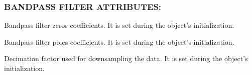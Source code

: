 \documentclass[letterpaper,10pt,english]{sphinxmanual}
\begin{document}
\subsubsection{BANDPASS FILTER ATTRIBUTES:}
\label{pYAAPT:bandpass-filter-attributes}

\begin{fulllineitems}
\label{pYAAPT:BandpassFilter.b}
Bandpass filter zeros coefficients. It is set during the object's initialization.

\end{fulllineitems}


\begin{fulllineitems}
\label{pYAAPT:BandpassFilter.a}
Bandpass filter poles coefficients. It is set during the object's initialization.

\end{fulllineitems}


\begin{fulllineitems}
\label{pYAAPT:BandpassFilter.dec_factor}
Decimation factor used for downsampling the data. It is set during the object's initialization.

\end{fulllineitems}


\begin{thebibliography}{ref1}
\end{thebibliography}



\renewcommand{\indexname}{Index}
\printindex
\end{document}
